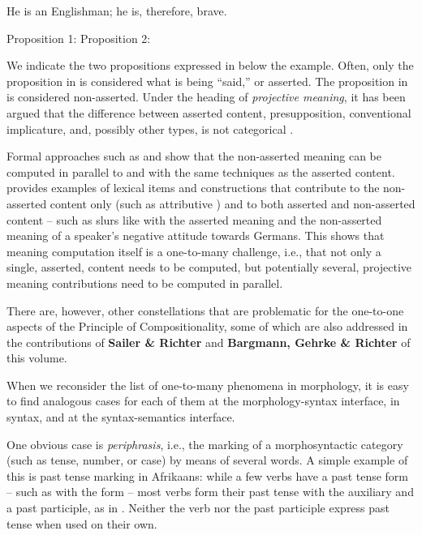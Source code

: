 \documentclass[output=paper]{langscibook}
\begin{document}
\ea
 He is an Englishman; he is, therefore, brave. 
 \citep[44]{Grice:75}\label{ex-grice}
 \begin{xlist}
 \ex Proposition 1: \label{ex-grice-ai}
 \ex Proposition 2: \label{ex-grice-ci}
 \end{xlist}
\z 

We indicate the two propositions expressed in  below
the example.  Often, only the proposition in  is
considered what is being ``said,'' or asserted.  The proposition in
 is considered non-asserted.  Under the heading of
\emph{projective meaning}, it has been argued that the difference
between asserted content, presupposition, conventional implicature,
and, possibly other types, is not categorical
\citep{Tonhauser:al:13,AnderBois:al:15}.

Formal approaches such as \citet{Potts:05} and \citet{Liu:12} show that
the non-asserted meaning can be computed in parallel to and with the
same techniques as the asserted content.  \citet{Gutzmann2013} provides
examples of lexical items and constructions that contribute to the
non-asserted content only (such as attributive ) and to both
asserted and non-asserted content -- such as slurs like 
with the asserted meaning  and the non-asserted
meaning of a speaker's negative attitude towards Germans.  This shows
that meaning computation itself is a one-to-many challenge, i.e., that
not only a single, asserted, content needs to be computed, but
 potentially several, projective meaning contributions need to be
computed in parallel.

\begin{sloppypar}
  There are, however, other constellations that are problematic for
  the one-to-one aspects of the Principle of Compositionality, some of
  which are also addressed in the contributions of \textbf{Sailer \&
    Richter} and \textbf{Bargmann, Gehrke \& Richter} of this volume.
\end{sloppypar}


\medskip%
When we reconsider the list of one-to-many phenomena in morphology, it
is easy to find analogous cases for each of them at the
morphology-syntax interface, in syntax, and at the syntax-semantics
interface.  

One obvious case is \emph{periphrasis}, i.e., the marking of a
morphosyntactic category (such as tense, number, or case) by means of
several words.  A simple example of this is past tense marking in
Afrikaans: while a few verbs have a past tense form -- such as
 with the form  -- most verbs form
their past tense with the auxiliary  and a past
participle, as in . Neither the verb
 nor the past participle  express past tense
when used on their own.
\end{document}
